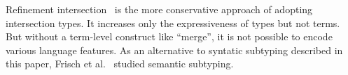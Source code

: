 

Refinement
intersection~\cite{dunfield2007refined,davies2005practical,freeman1991refinement}
is the more conservative approach of adopting intersection types. It increases
only the expressiveness of types but not terms. But without a term-level
construct like ``merge'', it is not possible to encode various language
features. As an alternative to syntatic subtyping described in this paper,
Frisch et al.~\cite{frisch2008semantic} studied semantic subtyping.

